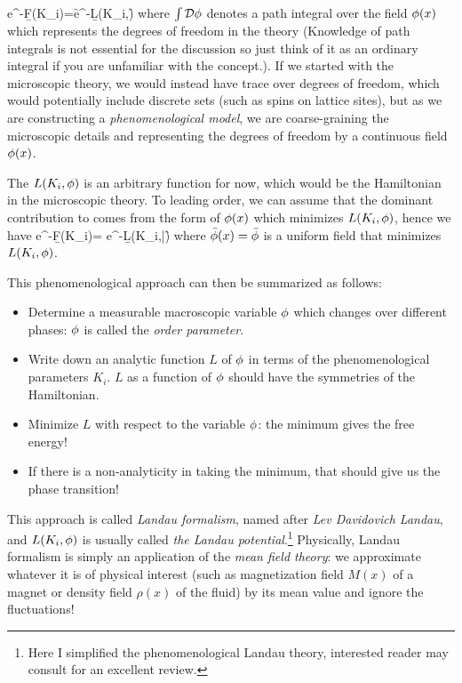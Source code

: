 \be 
\label{eq: landau potential in path integral}
e^{-\b F(K_i)}=\int \cD\f e^{-\b L(K_i,\f)}
\ee 
where $\int \mathcal{D}\phi$ denotes a path integral over the field $\phi(x)$ which represents the degrees of freedom in the theory (Knowledge of path integrals is not essential for the discussion so just think of it as an ordinary integral if you are unfamiliar with the concept.). If we started with the microscopic theory, we would instead have trace over degrees of freedom, which would potentially include discrete sets (such as spins on lattice sites), but as we are constructing a \emph{phenomenological model}, we are coarse-graining the microscopic details and representing the degrees of freedom by a continuous field $\phi(x)$.

The $L(K_i,\phi)$ is an arbitrary function for now, which would be the Hamiltonian in the microscopic theory. To leading order, we can assume that the dominant contribution to  comes from the form of $\phi(x)$ which minimizes $L(K_i,\phi)$, hence we have 
\be 
e^{-\b F(K_i)}= e^{-\b L(K_i,\bar\f)}
\ee 
where $\bar{\phi}(x)=\bar{\phi}$ is a uniform field that minimizes $L(K_i,\phi)$.

This phenomenological approach can then be summarized as follows:
\begin{itemize}
	\item Determine a measurable macroscopic variable $\phi$ which changes over different phases: $\phi$ is called the \emph{order parameter}.
	\item Write down an analytic function $L$ of $\phi$ in terms of the phenomenological parameters $K_i$. $L$ as a function of $\phi$ should have the symmetries of the Hamiltonian.
	\item Minimize $L$ with respect to the variable $\phi$: the minimum gives the free energy!
	\item If there is a non-analyticity in taking the minimum, that should give us the phase transition!
\end{itemize}
This approach is called \emph{Landau formalism}, named after \emph{Lev Davidovich Landau}, and $L(K_i,\phi)$ is usually called \emph{the Landau potential}.\footnote{Here I simplified the phenomenological Landau theory, interested reader may consult \cite{Goldenfeld:1992qy} for an excellent review.} Physically, Landau formalism is simply an application of the \emph{mean field theory}: we approximate whatever it is of physical interest (such as magnetization field $M(x)$ of a magnet or density field $\rho(x)$ of the fluid) by its mean value and ignore the fluctuations!

